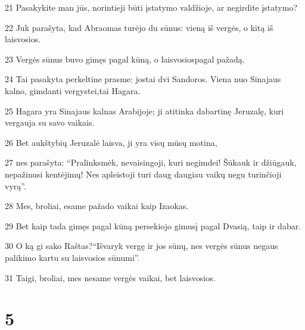 \par 21 Pasakykite man jūs, norintieji būti įstatymo valdžioje, ar negirdite įstatymo? 
\par 22 Juk parašyta, kad Abraomas turėjo du sūnus: vieną iš vergės, o kitą iš laisvosios. 
\par 23 Vergės sūnus buvo gimęs pagal kūną, o laisvosios­pagal pažadą. 
\par 24 Tai pasakyta perkeltine prasme: jos­tai dvi Sandoros. Viena nuo Sinajaus kalno, gimdanti vergystei,­tai Hagara. 
\par 25 Hagara yra Sinajaus kalnas Arabijoje; ji atitinka dabartinę Jeruzalę, kuri vergauja su savo vaikais. 
\par 26 Bet aukštybių Jeruzalė laisva, ji yra visų mūsų motina, 
\par 27 nes parašyta: “Pralinksmėk, nevaisingoji, kuri negimdei! Šūkauk ir džiūgauk, nepažinusi kentėjimų! Nes apleistoji turi daug daugiau vaikų negu turinčioji vyrą”. 
\par 28 Mes, broliai, esame pažado vaikai kaip Izaokas. 
\par 29 Bet kaip tada gimęs pagal kūną persekiojo gimusį pagal Dvasią, taip ir dabar. 
\par 30 O ką gi sako Raštas?­“Išvaryk vergę ir jos sūnų, nes vergės sūnus negaus palikimo kartu su laisvosios sūnumi”. 
\par 31 Taigi, broliai, mes nesame vergės vaikai, bet laisvosios.


\chapter{5}


